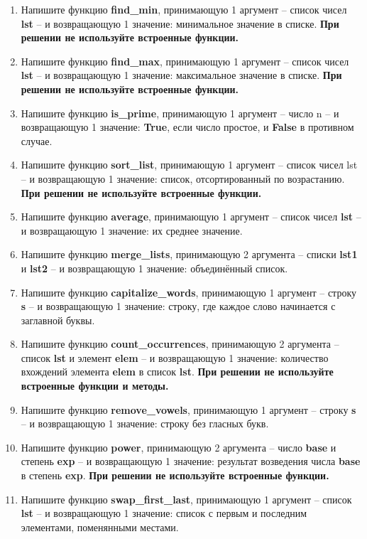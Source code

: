 \documentclass[a4,12pt]{article}
\theoremstyle{remark}
\begin{document}
\begin{enumerate}
    \item Напишите функцию \textbf{find\_min}, принимающую 1 аргумент – список чисел \textbf{lst} – и возвращающую 1 значение: минимальное значение в списке. \textbf{При решении не используйте встроенные функции.}
    \item Напишите функцию \textbf{find\_max}, принимающую 1 аргумент – список чисел \textbf{lst} – и возвращающую 1 значение: максимальное значение в списке. \textbf{При решении не используйте встроенные функции.}
    \item Напишите функцию \textbf{is\_prime}, принимающую 1 аргумент – число n – и возвращающую 1 значение: \textbf{True}, если число простое, и \textbf{False} в противном случае.
    \item Напишите функцию \textbf{sort\_list}, принимающую 1 аргумент – список чисел lst – и возвращающую 1 значение: список, отсортированный по возрастанию. \textbf{При решении не используйте встроенные функции.}
    \item Напишите функцию \textbf{average}, принимающую 1 аргумент – список чисел \textbf{lst} – и возвращающую 1 значение: их среднее значение.
    \item Напишите функцию \textbf{merge\_lists}, принимающую 2 аргумента – списки \textbf{lst1} и \textbf{lst2} – и возвращающую 1 значение: объединённый список.
    \item Напишите функцию \textbf{capitalize\_words}, принимающую 1 аргумент – строку \textbf{s} – и возвращающую 1 значение: строку, где каждое слово начинается с заглавной буквы.
    \item Напишите функцию \textbf{count\_occurrences}, принимающую 2 аргумента – список \textbf{lst} и элемент \textbf{elem} – и возвращающую 1 значение: количество вхождений элемента \textbf{elem} в список \textbf{lst}. \textbf{При решении не используйте встроенные функции и методы.}
    \item Напишите функцию \textbf{remove\_vowels}, принимающую 1 аргумент – строку \textbf{s} – и возвращающую 1 значение: строку без гласных букв.
    \item Напишите функцию \textbf{power}, принимающую 2 аргумента – число \textbf{base} и степень \textbf{exp} – и возвращающую 1 значение: результат возведения числа \textbf{base} в степень \textbf{exp}. \textbf{При решении не используйте встроенные функции.}
    \item Напишите функцию \textbf{swap\_first\_last}, принимающую 1 аргумент – список \textbf{lst} – и возвращающую 1 значение: список с первым и последним элементами, поменянными местами.

\end{enumerate}
\end{document}
